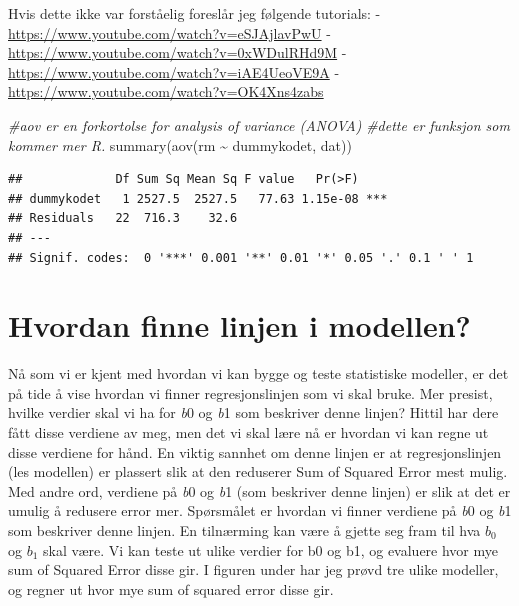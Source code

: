 \documentclass[
]{book}
\newenvironment{Shaded}{\begin{snugshade}}{\end{snugshade}}
\newcommand{\CommentTok}[1]{\textcolor[rgb]{0.56,0.35,0.01}{\textit{#1}}}
\newcommand{\FunctionTok}[1]{\textcolor[rgb]{0.00,0.00,0.00}{#1}}
\newcommand{\NormalTok}[1]{#1}
\newcommand{\SpecialCharTok}[1]{\textcolor[rgb]{0.00,0.00,0.00}{#1}}
\begin{document}
Hvis dette ikke var forståelig foreslår jeg følgende tutorials:
- \url{https://www.youtube.com/watch?v=eSJAjlavPwU}
- \url{https://www.youtube.com/watch?v=0xWDulRHd9M}
- \url{https://www.youtube.com/watch?v=iAE4UeoVE9A}
- \url{https://www.youtube.com/watch?v=OK4Xns4zabs}

\begin{Shaded}
\begin{Highlighting}[]
\CommentTok{\#aov er en forkortolse for analysis of variance (ANOVA)}
\CommentTok{\#dette er funksjon som kommer mer R.}
\FunctionTok{summary}\NormalTok{(}\FunctionTok{aov}\NormalTok{(rm }\SpecialCharTok{\textasciitilde{}}\NormalTok{ dummykodet, dat))}
\end{Highlighting}
\end{Shaded}

\begin{verbatim}
##             Df Sum Sq Mean Sq F value   Pr(>F)    
## dummykodet   1 2527.5  2527.5   77.63 1.15e-08 ***
## Residuals   22  716.3    32.6                     
## ---
## Signif. codes:  0 '***' 0.001 '**' 0.01 '*' 0.05 '.' 0.1 ' ' 1
\end{verbatim}

\hypertarget{hvordan-finne-linjen-i-modellen}{%
\chapter{Hvordan finne linjen i modellen?}\label{hvordan-finne-linjen-i-modellen}}

Nå som vi er kjent med hvordan vi kan bygge og teste statistiske modeller, er det på tide å vise hvordan vi finner regresjonslinjen som vi skal bruke. Mer presist, hvilke verdier skal vi ha for \emph{b}0 og \emph{b}1 som beskriver denne linjen? Hittil har dere fått disse verdiene av meg, men det vi skal lære nå er hvordan vi kan regne ut disse verdiene for hånd. En viktig sannhet om denne linjen er at regresjonslinjen (les modellen) er plassert slik at den reduserer Sum of Squared Error mest mulig. Med andre ord, verdiene på \emph{b}0 og \emph{b}1 (som beskriver denne linjen) er slik at det er umulig å redusere error mer. Spørsmålet er hvordan vi finner verdiene på \emph{b}0 og \emph{b}1 som beskriver denne linjen. En tilnærming kan være å gjette seg fram til hva \(b_0\) og \(b_1\) skal være. Vi kan teste ut ulike verdier for b0 og b1, og evaluere hvor mye sum of Squared Error disse gir. I figuren under har jeg prøvd tre ulike modeller, og regner ut hvor mye sum of squared error disse gir.
\end{document}
